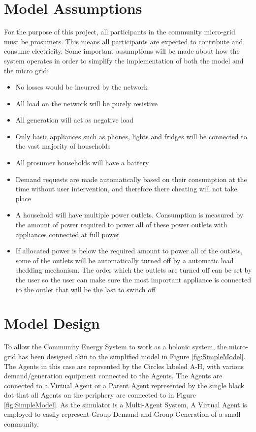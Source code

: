 \section*{Model Assumptions}
For the purpose of this project, all participants in the community micro-grid must be prosumers. This means all participants are expected to contribute and consume electricity. Some important assumptions will be made about how the system operates in order to simplify the implementation of both the model and the micro grid:
\begin{itemize}
	\item No losses would be incurred by the network
	\item All load on the network will be purely resistive
	\item All generation will act as negative load
	\item Only basic appliances such as phones, lights and fridges will be connected to the vast majority of households 
	\item All prosumer households will have a battery
	\item Demand requests are made automatically based on their consumption at the time without user intervention, and therefore there cheating will not take place
		\item A household will have multiple power outlets. Consumption is measured by the amount of power required to power all of these power outlets with appliances connected at full power
		\item If allocated power is below the required amount to power all of the outlets, some of the outlets will be automatically turned off by a automatic load shedding mechanism. The order which the outlets are turned off can be set by the user so the user can make sure the most important appliance is connected to the outlet that will be the last to switch off
\end{itemize}

\section*{Model Design}
To allow the Community Energy System to work as a holonic system, the micro-grid has been designed akin to the simplified model in Figure \ref{fig:SimpleModel}. The Agents in this case are reprsented by the Circles labeled A-H, with various demand/generation equipment connected to the Agents. The Agents are connected to a Virtual Agent or a Parent Agent represented by the single black dot that all Agents on the periphery are connected to in Figure \ref{fig:SimpleModel}. As the simulator is a Multi-Agent System, A Virtual Agent is employed to easily represent Group Demand and Group Generation of a small community.

